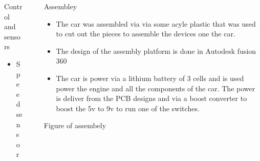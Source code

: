 \documentclass[final,hyperref={pdfpagelabels=false}]{beamer}
\begin{document}
\begin{frame}[t]
\begin{columns}[t]
\begin{column}{.465\textwidth}
\begin{block}{Control and sensors}
\begin{itemize}
    \item Speed sensor
\end{itemize}

\end{block}

%	




\end{column} %

\begin{column}{.03\textwidth}\end{column} %
 
\begin{column}{.465\textwidth} %
    \begin{block}{Assembley}

        \begin{itemize}
            \item The car was assembled via via some acyle plastic that was used to cut out the pieces to assemble the devices one the car.
            \item The design of the assembly platform is done in Autodesk fusion 360
            
            
            \item The car is power via a lithium battery of 3 cells and is used power the engine and all the components of the car. The power is deliver from the PCB designs and via a boost converter to boost the 5v to 9v to run one of the switches.
              
        \end{itemize}
    
    \end{block}
\begin{block}{Figure of assembely}
    
\end{block}


\






\end{column}
\end{columns}
\end{frame}
\end{document}
